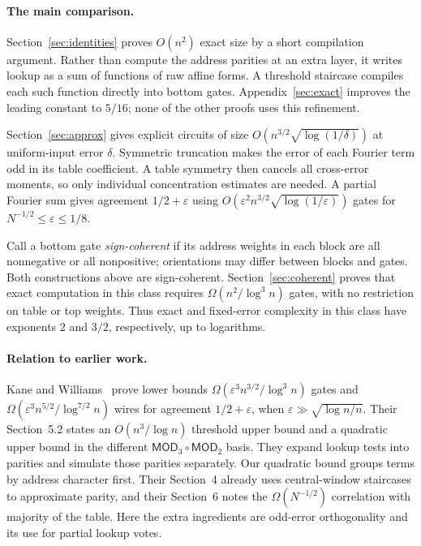 \documentclass[11pt]{article}
\begin{document}
\paragraph{The main comparison.}
Section~\ref{sec:identities} proves $O(n^2)$ exact size by a short
compilation argument. Rather than compute the address parities at an
extra layer, it writes lookup as a sum of functions of raw affine forms.
A threshold staircase compiles each such function directly into bottom
gates. Appendix~\ref{sec:exact} improves the leading constant to $5/16$;
none of the other proofs uses this refinement.

Section~\ref{sec:approx} gives explicit circuits of size
$O(n^{3/2}\sqrt{\log(1/\delta)})$ at uniform-input error $\delta$.
Symmetric truncation makes the error of each Fourier term odd in its
table coefficient. A table symmetry then cancels all cross-error moments,
so only individual concentration estimates are needed. A partial Fourier
sum gives agreement $1/2+\varepsilon$ using
$O(\varepsilon^2n^{3/2}\sqrt{\log(1/\varepsilon)})$ gates for
$N^{-1/2}\le\varepsilon\le1/8$.

Call a bottom gate \emph{sign-coherent} if its address weights in each
block are all nonnegative or all nonpositive; orientations may differ
between blocks and gates. Both constructions above are sign-coherent.
Section~\ref{sec:coherent} proves that exact computation in this class
requires $\Omega(n^2/\log^3 n)$ gates, with no restriction on table or
top weights. Thus exact and fixed-error complexity in this class have
exponents $2$ and $3/2$, respectively, up to logarithms.

\paragraph{Relation to earlier work.}
Kane and Williams~\cite[Theorems~1.1--1.2]{KW} prove lower bounds
$\Omega(\varepsilon^3n^{3/2}/\log^3 n)$ gates and
$\Omega(\varepsilon^3n^{5/2}/\log^{7/2}n)$ wires for agreement
$1/2+\varepsilon$, when $\varepsilon\gg\sqrt{\log n/n}$.
Their Section~5.2 states an $O(n^3/\log n)$ threshold upper bound and
a quadratic upper bound in the different $\mathsf{MOD}_3\circ\mathsf{MOD}_2$
basis. They expand lookup tests into parities and simulate those parities
separately. Our quadratic bound groups terms by address character first.
Their Section~4 already uses central-window staircases to approximate
parity, and their Section~6 notes the $\Omega(N^{-1/2})$ correlation with
majority of the table. Here the extra ingredients are odd-error
orthogonality and its use for partial lookup votes.
\end{document}
